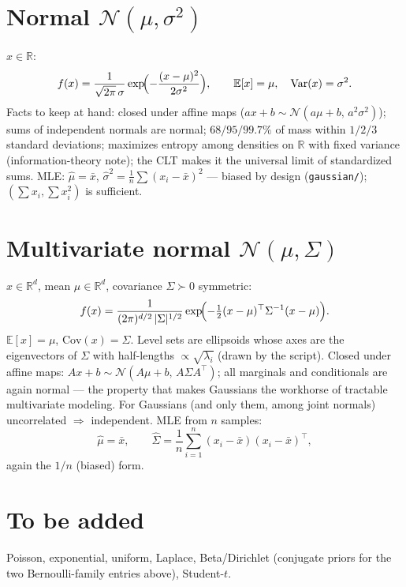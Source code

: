\documentclass[11pt]{article}
\begin{document}
\section{Normal $\mathcal{N}(\mu,\sigma^2)$}

$x \in \mathbb{R}$:
\begin{equation}
  f(x) = \frac{1}{\sqrt{2\pi}\,\sigma}
         \exp\!\Bigl(-\frac{(x-\mu)^2}{2\sigma^2}\Bigr),
  \qquad
  \mathbb{E}[x]=\mu,\quad \mathrm{Var}(x)=\sigma^2 .
  \label{eq:normal}
\end{equation}
Facts to keep at hand: closed under affine maps
($ax+b \sim \mathcal{N}(a\mu+b,\, a^2\sigma^2)$); sums of independent
normals are normal; $68/95/99.7\%$ of mass within $1/2/3$ standard
deviations; maximizes entropy among densities on $\mathbb{R}$ with fixed
variance (information-theory note); the CLT makes it the universal limit
of standardized sums. MLE: $\hat\mu = \bar x$, $\hat\sigma^2 =
\tfrac1n\sum(x_i-\bar x)^2$ --- biased by design (\texttt{gaussian/});
$(\sum x_i, \sum x_i^2)$ is sufficient.

\section{Multivariate normal $\mathcal{N}(\mu, \Sigma)$}

$x \in \mathbb{R}^d$, mean $\mu \in \mathbb{R}^d$, covariance
$\Sigma \succ 0$ symmetric:
\begin{equation}
  f(x) = \frac{1}{(2\pi)^{d/2}\,|\Sigma|^{1/2}}
         \exp\!\Bigl(-\tfrac12 (x-\mu)^\top \Sigma^{-1} (x-\mu)\Bigr).
  \label{eq:mvn}
\end{equation}
$\mathbb{E}[x]=\mu$, $\mathrm{Cov}(x)=\Sigma$. Level sets are ellipsoids
whose axes are the eigenvectors of $\Sigma$ with half-lengths
$\propto\sqrt{\lambda_i}$ (drawn by the script). Closed under affine maps:
$Ax+b \sim \mathcal{N}(A\mu+b,\, A\Sigma A^\top)$; all marginals and
conditionals are again normal --- the property that makes Gaussians the
workhorse of tractable multivariate modeling. For Gaussians (and only
them, among joint normals) uncorrelated $\Rightarrow$ independent. MLE
from $n$ samples:
\begin{equation}
  \hat\mu = \bar x,
  \qquad
  \hat\Sigma = \frac1n \sum_{i=1}^n (x_i-\bar x)(x_i-\bar x)^\top ,
  \label{eq:mvnmle}
\end{equation}
again the $1/n$ (biased) form.

\section*{To be added}

Poisson, exponential, uniform, Laplace, Beta/Dirichlet (conjugate priors
for the two Bernoulli-family entries above), Student-$t$.
\end{document}
